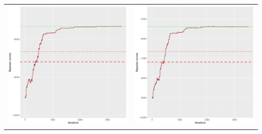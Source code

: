 \documentclass[]{scrartcl}
\begin{document}
\begin{table}[h!]
\begin{tabular}{cc}
\includegraphics[scale = 0.4]{./figs/alarm/v5/30/bayBoundsEvolution-3502.pdf} & 
\includegraphics[scale = 0.4]{./figs/alarm/v5/50/bayBoundsEvolution-3502.pdf} \\

\end{tabular}
\end{table}
\end{document}
